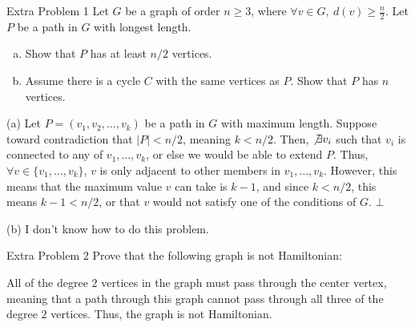 \documentclass[10pt]{extarticle}
\begin{document}
  \begin{problem}{Extra Problem 1}
    Let $G$ be a graph of order $n\geq 3$, where $\forall v\in G,~d(v) \geq \frac{n}{2}$. Let $P$ be a path in $G$ with longest length.
    \begin{enumerate}[(a)]
      \item Show that $P$ has at least $n/2$ vertices.
      \item Assume there is a cycle $C$ with the same vertices as $P$. Show that $P$ has $n$ vertices.
    \end{enumerate}
    \tcblower
    \begin{problem}{(a)}
      Let $P = (v_1,v_2,\dots,v_k)$ be a path in $G$ with maximum length. Suppose toward contradiction that $|P| < n/2$, meaning $k< n/2$. Then, $\not\exists v_i$ such that $v_i$ is connected to any of $v_1,\dots,v_k$, or else we would be able to extend $P$. Thus, $\forall v\in \{v_1,\dots,v_k\}$, $v$ is only adjacent to other members in $v_1,\dots,v_k$. However, this means that the maximum value $v$ can take is $k-1$, and since $k < n/2$, this means $k-1 < n/2$, or that $v$ would not satisfy one of the conditions of $G$. $\bot$
    \end{problem}
    \begin{problem}{(b)}
      I don't know how to do this problem.
    \end{problem}
  \end{problem}
  \begin{problem}{Extra Problem 2}
    Prove that the following graph is not Hamiltonian:
    \begin{center}
    \end{center}
    \tcblower
    All of the degree $2$ vertices in the graph must pass through the center vertex, meaning that a path through this graph cannot pass through all three of the degree $2$ vertices. Thus, the graph is not Hamiltonian.
  \end{problem}
\end{document}
